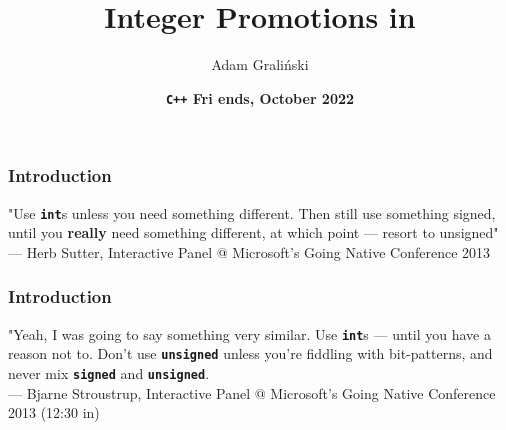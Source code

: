 \documentclass[aspectratio=169]{beamer}
\title[Friends\#23 :: \cpp{IntegerPromotions}]{Integer Promotions in \cpp{C++}}
\author{Adam Graliński}
\date[July'22]{\textbf{\texttt{\color[HTML]{d33682}C++} {\color[HTML]{268bd2}F}{\color[HTML]{2aa198}r}{\color[HTML]{859900}i}%
{\color[HTML]{cb4b16}e}{\color[HTML]{dc322f}n}{\color[HTML]{6c71c4}d}{\color[HTML]{b58900}s}, October 2022}}
\newcommand{\cpp}[1]{\texttt{\textbf{\textcolor{clCodeBlue}{#1}}}}
\begin{document}
{
\begin{frame}
\titlepage{}
\end{frame}
}

\begin{frame}[fragile]
\frametitle{Introduction}
\begin{center}
"Use \cpp{int}s unless you need something different.
Then still use something signed, until you \textbf{really} need something
different, at which point --- resort to unsigned" \\
\vspace{12pt}
--- Herb Sutter, Interactive Panel @ Microsoft's Going Native Conference 2013
\end{center}
\end{frame}


\begin{frame}[fragile]
\frametitle{Introduction}
\begin{center}
"Yeah, I was going to say something very similar.
Use \cpp{int}s --- until you have a reason not to. Don't use \cpp{unsigned} unless you're fiddling with bit-patterns,
and never mix \cpp{signed} and \cpp{unsigned}. \\
\vspace{12pt}
--- Bjarne Stroustrup, Interactive Panel @ Microsoft's Going Native Conference 2013 (12:30 in)
\end{center}
\end{frame}
\end{document}
